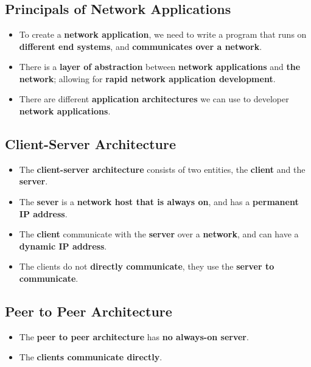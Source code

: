 \documentclass{article}
\begin{document}
    \section*{}

    \subsection*{Principals of Network Applications}
    \begin{itemize}
        \item To create a \textbf{network application}, we need to write a program that runs on \textbf{different end systems}, and \textbf{communicates over a network}.
        \item There is a \textbf{layer of abstraction} between \textbf{network applications} and \textbf{the network}; allowing for \textbf{rapid network application development}.
        \item There are different \textbf{application architectures} we can use to developer \textbf{network applications}.
    \end{itemize}

    \subsection*{Client-Server Architecture}
    \begin{itemize}
        \item The \textbf{client-server architecture} consists of two entities, the \textbf{client} and the \textbf{server}.
        \item The \textbf{sever} is a \textbf{network host that is always on}, and has a \textbf{permanent IP address}.
        \item The \textbf{client} communicate with the \textbf{server} over a \textbf{network}, and can have a \textbf{dynamic IP address}.
        \item The clients do not \textbf{directly communicate}, they use the \textbf{server to communicate}.
    \end{itemize}

    \subsection*{Peer to Peer Architecture}
    \begin{itemize}
        \item The \textbf{peer to peer architecture} has \textbf{no always-on server}.
        \item The \textbf{clients communicate directly}.
    \end{itemize}
\end{document}
